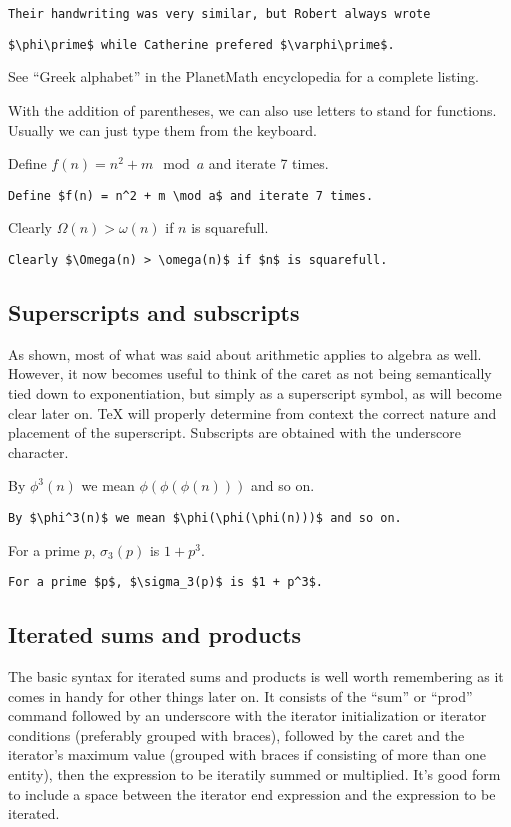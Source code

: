 \verb'Their handwriting was very similar, but Robert always wrote'

\verb'$\phi\prime$ while Catherine prefered $\varphi\prime$.'

See ``Greek alphabet'' in the PlanetMath encyclopedia for a complete listing.

With the addition of parentheses, we can also use letters to stand for functions. Usually we can just type them from the keyboard.

Define $f(n) = n^2 + m \mod a$ and iterate 7 times.

\verb'Define $f(n) = n^2 + m \mod a$ and iterate 7 times.'

Clearly $\Omega(n) > \omega(n)$ if $n$ is squarefull.

\verb'Clearly $\Omega(n) > \omega(n)$ if $n$ is squarefull.'

\subsection{Superscripts and subscripts}

As shown, most of what was said about arithmetic applies to algebra as well. However, it now becomes useful to think of the caret as not being semantically tied down to exponentiation, but simply as a superscript symbol, as will become clear later on. \TeX{} will properly determine from context the correct nature and placement of the superscript. Subscripts are obtained with the underscore character.

By $\phi^3(n)$ we mean $\phi(\phi(\phi(n)))$ and so on.

\verb'By $\phi^3(n)$ we mean $\phi(\phi(\phi(n)))$ and so on.'

For a prime $p$, $\sigma_3(p)$ is $1 + p^3$.

\verb'For a prime $p$, $\sigma_3(p)$ is $1 + p^3$.'

\subsection{Iterated sums and products}

The basic syntax for iterated sums and products is well worth remembering as it comes in handy for other things later on. It consists of the ``sum'' or ``prod'' command followed by an underscore with the iterator initialization or iterator conditions (preferably grouped with braces), followed by the caret and the iterator's maximum value (grouped with braces if consisting of more than one entity), then the expression to be iteratily summed or multiplied. It's good form to include a space between the iterator end expression and the expression to be iterated.


